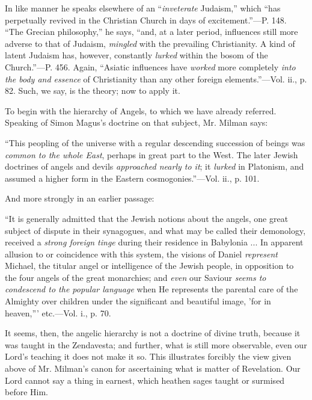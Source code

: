 In like manner he speaks elsewhere of an ``\emph{inveterate}
Judaism,'' which ``has perpetually revived in the Christian Church in
days of excitement.''—P. 148. ``The Grecian philosophy,'' he says, ``and,
at a later period, influences still more adverse to that of Judaism, \emph{mingled}
with the prevailing Christianity. A kind of latent Judaism has,
however, constantly \emph{lurked} within the bosom of the Church.''—P.
456. Again, ``Asiatic influences have \emph{worked} more completely \emph{into
the body and essence} of Christianity than any other foreign
elements.''—Vol. ii., p. 82. Such, we say, is the theory; now to
apply it.

To begin with the hierarchy of Angels, to which
we have already referred. Speaking of Simon Magus's doctrine on that
subject, Mr. Milman says:

``This
peopling of the universe with a regular descending succession of
beings was \emph{common to the whole East}, perhaps in great part to
the West. The later Jewish doctrines of angels and devils \emph{approached
nearly to it}; it \emph{lurked} in Platonism, and assumed a higher
form in the Eastern cosmogonies.''—Vol. ii., p. 101.

And more strongly in an earlier passage:

``It
is generally admitted that the Jewish notions about the angels, one
great subject of dispute in their synagogues, and what may be called
their demonology, received a \emph{strong foreign tinge} during their
residence in Babylonia ... In apparent allusion to or coincidence with
this system, the visions of Daniel \emph{represent} Michael, the
titular angel or intelligence of the Jewish people, in opposition to
the four angels of the great monarchies; and \emph{even} our Saviour \emph{seems
to condescend to the popular language} when He represents the
parental care of the Almighty over children under the significant and
beautiful image, 'for in heaven,''' etc.—Vol. i., p. 70.

It seems, then, the angelic hierarchy is not a
doctrine of divine truth, because it was taught in the Zendavesta; and
further, what is still more observable, even our Lord's teaching it
does not make it so. This illustrates forcibly the view given
above of Mr. Milman's canon for ascertaining what is matter of
Revelation. Our Lord cannot say a thing in earnest, which heathen
sages taught or surmised before Him.

